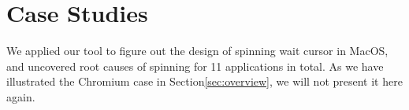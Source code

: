 \section{Case Studies} \label{sec:casestudy}
We applied our tool to figure out the design of spinning wait cursor in MacOS,
and uncovered root causes of spinning for 11 applications in total.
As we have illustrated the Chromium case in Section\ref{sec:overview},
we will not present it here again.






